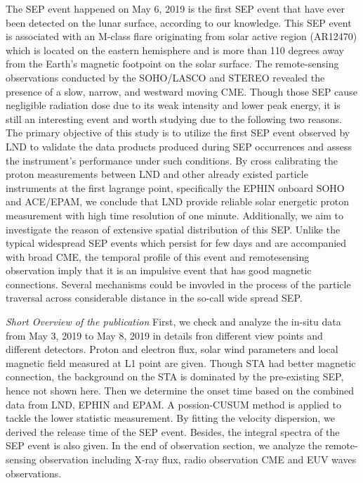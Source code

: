 The \ac{SEP} event happened on May 6, 2019 is the first \ac{SEP} event that have ever been detected on the lunar surface, according to our knowledge. 
This \ac{SEP} event is associated with an M-class flare originating from solar active region (AR12470) which is located on the eastern hemisphere and is more than 110 degrees away from the Earth's magnetic footpoint on the solar surface. The remote-sensing observations conducted by the \ac{SOHO}/\ac{LASCO} and \ac{STEREO} revealed the presence of a slow, narrow, and westward moving \ac{CME}. 
Though those \acs{SEP} cause negligible radiation dose due to its weak intensity and lower peak energy, it is still an interesting event and worth studying due to the following two reasons.
The primary objective of this study is to utilize the first \ac{SEP} event observed by \ac{LND} to validate the data products produced during \ac{SEP} occurrences and assess the instrument's performance under such conditions. By cross calibrating the proton measurements between \ac{LND} and other already existed particle instruments at the first lagrange point, specifically the \ac{EPHIN} onboard \ac{SOHO} and \ac{ACE}/\ac{EPAM}, we conclude that \ac{LND} provide reliable solar energetic proton measurement with high time resolution of one minute.
Additionally, we aim to investigate the reason of extensive spatial distribution of this \ac{SEP}. Unlike the typical widespread \ac{SEP} events which persist for few days and are accompanied with broad \ac{CME}, the temporal profile of this event and remotesensing observation imply that it is an impulsive event that has good magnetic connections. Several mechanisms could be invovled in the process of the particle traversal across considerable distance in the so-call wide spread \acs{SEP}. 

\textit{Short Overview of the publication}
First, we check and analyze the in-situ data from May 3, 2019 to May 8, 2019 in details fron different view points and different detectors. Proton and electron flux, solar wind parameters and local magnetic field measured at L1 point are given.
Though STA had better magnetic connection, the background on the STA is dominated by the pre-existing \ac{SEP}, hence not shown here.
Then we determine the onset time based on the combined data from \ac{LND}, \ac{EPHIN} and \ac{EPAM}. A possion-CUSUM method is applied to tackle the lower statistic measurement. By fitting the velocity dispersion, we derived the release time of the \ac{SEP} event. Besides, the integral spectra of the \ac{SEP} event is also given. In the end of observation section, we analyze the remote-sensing observation including X-ray flux, radio observation \ac{CME} and EUV waves observations.

